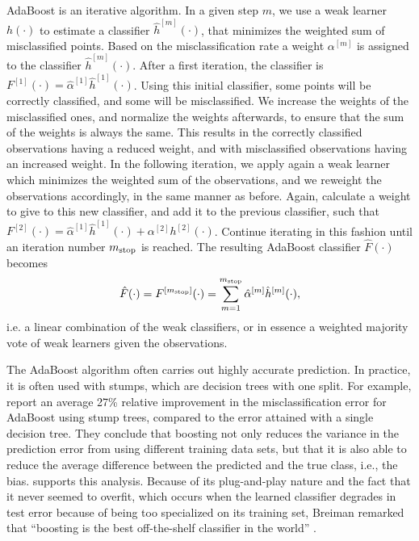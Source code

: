 AdaBoost is an iterative algorithm.
In a given step $m$, we use a weak learner $h(\cdot)$ to estimate a classifier $\hat{h}^{[m]}(\cdot)$, that minimizes the weighted sum of misclassified points.
Based on the misclassification rate a weight $\alpha^{[m]}$ is assigned to the classifier $\hat{h}^{[m]}(\cdot)$.
After a first iteration, the classifier is $F^{[1]}(\cdot)=\hat{\alpha}^{[1]}\hat{h}^{[1]}(\cdot)$.
Using this initial classifier, some points will be correctly classified, and some will be misclassified.
We increase the weights of the misclassified ones, and normalize the weights afterwards, to ensure that the sum of the weights is always the same.
This results in the correctly classified observations having a reduced weight, and with misclassified observations having an increased weight.
In the following iteration, we apply again a weak learner which minimizes the weighted sum of the observations, and we reweight the observations accordingly, in the same manner as before.
Again, calculate a weight to give to this new classifier, and add it to the previous classifier, such that $F^{[2]}(\cdot)=\hat{\alpha}^{[1]}\hat{h}^{[1]}(\cdot)+\alpha^{[2]}h^{[2]}(\cdot)$.
Continue iterating in this fashion until an iteration number $m_{\text{stop}}$ is reached.
The resulting AdaBoost classifier $\hat{F}(\cdot)$ becomes
\begin{equation*}
    \hat{F}(\cdot)=F^{[m_{\text{stop}}]}(\cdot)=\sum_{m=1}^{m_{\text{stop}}}\hat{\alpha}^{[m]}\hat{h}^{[m]}(\cdot),
\end{equation*}
i.e. a linear combination of the weak classifiers, or in essence a weighted majority vote of weak learners given the observations.

The AdaBoost algorithm often carries out highly accurate prediction.
In practice, it is often used with stumps, which are decision trees with one split.
For example, \citet{bauer-kohavi} report an average 27\% relative improvement in the misclassification error for AdaBoost using stump trees, compared to the error attained with a single decision tree.
They conclude that boosting not only reduces the variance in the prediction error from using different training data sets, but that it is also able to reduce the average difference between the predicted and the true class, i.e., the bias.
\citet{breiman1998} supports this analysis.
Because of its plug-and-play nature and the fact that it never seemed to overfit, which occurs when the learned classifier degrades in test error because of being too specialized on its training set, Breiman remarked that ``boosting is the best off-the-shelf classifier in the world'' \citep{ESL}.

